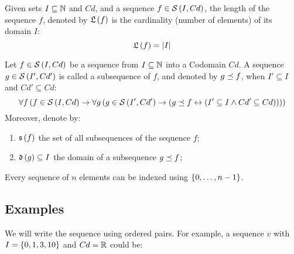 \begin{defn}
    Given sets $I \subseteq \mathbb{N}$ and $Cd$, and a sequence $f \in \mathcal{S}\left( I, Cd \right)$, the length of the sequence $f$, denoted by $\mathfrak{L}\left(f\right)$ is the cardinality (number of elements) of its domain $I$:
    \begin{equation}
        \mathfrak{L}\left(f\right) = |I|
    \end{equation}
\end{defn}

\begin{defn}[Subsequence]
    Let $f \in \mathcal{S}\left( I, Cd \right)$ be a sequence from $I \subseteq \mathbb{N}$ into a Codomain $Cd$. A sequence $g \in \mathcal{S}\left( I', Cd' \right)$ is called a subsequence of $f$, and denoted by $g \preceq f$, when $I' \subseteq I$ and $Cd' \subseteq Cd$:
    \begin{equation}
        \forall f \left(
            f \in \mathcal{S}\left( I, Cd \right)
            \rightarrow
            \forall g \left(
                g \in \mathcal{S}\left( I', Cd' \right)
                \rightarrow
                \left(
                    g \preceq f \leftrightarrow \left(
                        I' \subseteq I
                        \land
                        Cd' \subseteq Cd
                    \right)
                \right)
            \right)
        \right)
    \end{equation}
    Moreover, denote by:
    \begin{enumerate}
        \item $\mathfrak{s}\left(f\right)$ the set of all subsequences of the sequence $f$;
        \item $\mathfrak{d}\left(g\right) \subseteq I$ the domain of a subsequence $g \preceq f$;
    \end{enumerate}
\end{defn}

\begin{theorem}
    \label{theorem:equivalence-with-natural-sequence}
    Every sequence of $n$ elements can be indexed using $\left\{ 0, \dots, n-1 \right\}$.
\end{theorem}

\subsection{Examples}

We will write the sequence using ordered pairs. For example, a sequence $v$ with $I = \left\{ 0, 1, 3, 10 \right\}$ and $Cd = \mathbb{R}$ could be:

